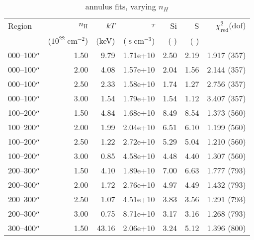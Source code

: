 \documentclass[preprint2,tighten,trackchanges]{aastex6}
\newcommand*{\mt}{\mathrm}
\newcommand*{\unit}[1]{\;\mt{#1}}  %
\begin{document}
\begin{table*}
    \centering
    \caption{annulus fits, varying $n_H$}
    \begin{tabular}{@{}lrrrrrr@{}}
        \toprule
        Region & $n_\mathrm{H}$             & $kT$  & $\tau$                & Si  & S   & $\chi^2_{\mathrm{red}} (\mathrm{dof}$) \\
               & ($10^{22} \unit{cm^{-2}}$) & (keV) & ($\unit{s\;cm^{-3}}$) & (-) & (-) &  \\
        \midrule
        000--100$\mbox{$^{\prime\prime}$}$ & 1.50 & 9.79 & 1.71e+10 & 2.50 & 2.19 & 1.917 (357) \\  %
        000--100$\mbox{$^{\prime\prime}$}$ & 2.00 & 4.08 & 1.57e+10 & 2.04 & 1.56 & 2.144 (357) \\  %
        000--100$\mbox{$^{\prime\prime}$}$ & 2.50 & 2.33 & 1.58e+10 & 1.74 & 1.27 & 2.756 (357) \\  %
        000--100$\mbox{$^{\prime\prime}$}$ & 3.00 & 1.54 & 1.79e+10 & 1.54 & 1.12 & 3.407 (357) \\  %
        \midrule
        100--200$\mbox{$^{\prime\prime}$}$ & 1.50 & 4.84 & 1.68e+10 & 8.49 & 8.54 & 1.373 (560) \\  %
        100--200$\mbox{$^{\prime\prime}$}$ & 2.00 & 1.99 & 2.04e+10 & 6.51 & 6.10 & 1.199 (560) \\  %
        100--200$\mbox{$^{\prime\prime}$}$ & 2.50 & 1.22 & 2.72e+10 & 5.29 & 5.04 & 1.210 (560) \\  %
        100--200$\mbox{$^{\prime\prime}$}$ & 3.00 & 0.85 & 4.58e+10 & 4.48 & 4.40 & 1.307 (560) \\  %
        \midrule
        200--300$\mbox{$^{\prime\prime}$}$ & 1.50 & 4.10 & 1.89e+10 & 7.00 & 6.63 & 1.777 (793) \\  %
        200--300$\mbox{$^{\prime\prime}$}$ & 2.00 & 1.72 & 2.76e+10 & 4.97 & 4.49 & 1.432 (793) \\  %
        200--300$\mbox{$^{\prime\prime}$}$ & 2.50 & 1.07 & 4.51e+10 & 3.83 & 3.56 & 1.291 (793) \\  %
        200--300$\mbox{$^{\prime\prime}$}$ & 3.00 & 0.75 & 8.71e+10 & 3.17 & 3.16 & 1.268 (793) \\  %
        \midrule
        300--400$\mbox{$^{\prime\prime}$}$ & 1.50 & 43.16 & 2.06e+10 & 3.24 & 5.12 & 1.396 (800) \\  %

\end{tabular}
\end{table*}
\end{document}
